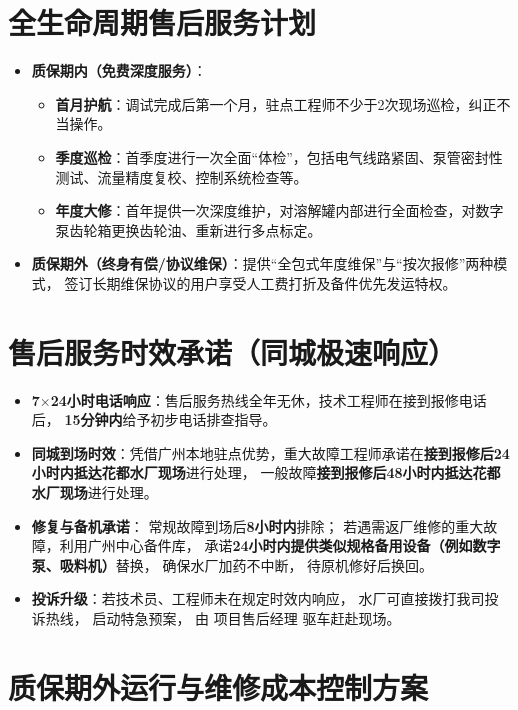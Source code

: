 \section{全生命周期售后服务计划}

\begin{itemize}
    \item \textbf{质保期内（免费深度服务）}：
    \begin{itemize}
        \item \textbf{首月护航}：调试完成后第一个月，驻点工程师不少于2次现场巡检，纠正不当操作。
        \item \textbf{季度巡检}：首季度进行一次全面“体检”，包括电气线路紧固、泵管密封性测试、流量精度复校、控制系统检查等。
        \item \textbf{年度大修}：首年提供一次深度维护，对溶解罐内部进行全面检查，对数字泵齿轮箱更换齿轮油、重新进行多点标定。
    \end{itemize}
    \item \textbf{质保期外（终身有偿/协议维保）}：提供“全包式年度维保”与“按次报修”两种模式，
        签订长期维保协议的用户享受人工费打折及备件优先发运特权。
\end{itemize}

\section{售后服务时效承诺（同城极速响应）}

\begin{itemize}
    \item \textbf{7\(\times\)24小时电话响应}：售后服务热线全年无休，技术工程师在接到报修电话后，
        \textbf{15分钟内}给予初步电话排查指导。
    \item \textbf{同城到场时效}：凭借广州本地驻点优势，重大故障工程师承诺在\textbf{接到报修后24小时内抵达花都水厂现场}进行处理，
        一般故障\textbf{接到报修后48小时内抵达花都水厂现场}进行处理。
    \item \textbf{修复与备机承诺}：
        常规故障到场后\textbf{8小时内}排除；
        若遇需返厂维修的重大故障，利用广州中心备件库，
        承诺\textbf{24小时内提供类似规格备用设备（例如数字泵、吸料机）}替换，
        确保水厂加药不中断，
        待原机修好后换回。
    \item \textbf{投诉升级}：若技术员、工程师未在规定时效内响应，
        水厂可直接拨打我司投诉热线，
        启动特急预案，
        由 项目售后经理 驱车赶赴现场。
\end{itemize}

\section{质保期外运行与维修成本控制方案}

